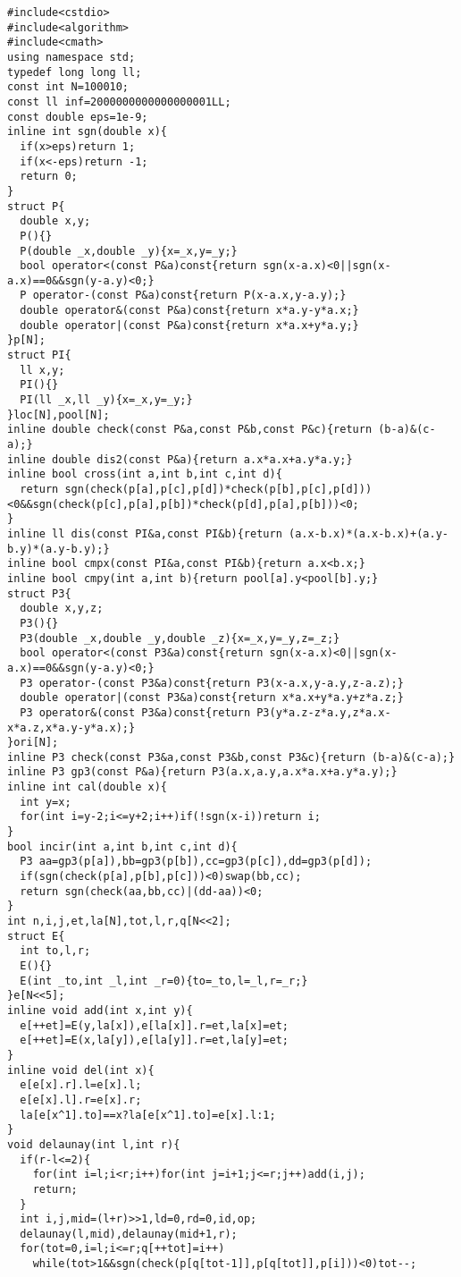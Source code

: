 \documentclass[12pt]{ctexart}
\begin{document}
\begin{lstlisting}
#include<cstdio>
#include<algorithm>
#include<cmath>
using namespace std;
typedef long long ll;
const int N=100010;
const ll inf=2000000000000000001LL;
const double eps=1e-9;
inline int sgn(double x){
  if(x>eps)return 1;
  if(x<-eps)return -1;
  return 0;
}
struct P{
  double x,y;
  P(){}
  P(double _x,double _y){x=_x,y=_y;}
  bool operator<(const P&a)const{return sgn(x-a.x)<0||sgn(x-a.x)==0&&sgn(y-a.y)<0;}
  P operator-(const P&a)const{return P(x-a.x,y-a.y);}
  double operator&(const P&a)const{return x*a.y-y*a.x;}
  double operator|(const P&a)const{return x*a.x+y*a.y;}
}p[N];
struct PI{
  ll x,y;
  PI(){}
  PI(ll _x,ll _y){x=_x,y=_y;}
}loc[N],pool[N];
inline double check(const P&a,const P&b,const P&c){return (b-a)&(c-a);}
inline double dis2(const P&a){return a.x*a.x+a.y*a.y;}
inline bool cross(int a,int b,int c,int d){
  return sgn(check(p[a],p[c],p[d])*check(p[b],p[c],p[d]))<0&&sgn(check(p[c],p[a],p[b])*check(p[d],p[a],p[b]))<0;
}
inline ll dis(const PI&a,const PI&b){return (a.x-b.x)*(a.x-b.x)+(a.y-b.y)*(a.y-b.y);}
inline bool cmpx(const PI&a,const PI&b){return a.x<b.x;}
inline bool cmpy(int a,int b){return pool[a].y<pool[b].y;}
struct P3{
  double x,y,z;
  P3(){}
  P3(double _x,double _y,double _z){x=_x,y=_y,z=_z;}
  bool operator<(const P3&a)const{return sgn(x-a.x)<0||sgn(x-a.x)==0&&sgn(y-a.y)<0;}
  P3 operator-(const P3&a)const{return P3(x-a.x,y-a.y,z-a.z);}
  double operator|(const P3&a)const{return x*a.x+y*a.y+z*a.z;}
  P3 operator&(const P3&a)const{return P3(y*a.z-z*a.y,z*a.x-x*a.z,x*a.y-y*a.x);}
}ori[N];
inline P3 check(const P3&a,const P3&b,const P3&c){return (b-a)&(c-a);}
inline P3 gp3(const P&a){return P3(a.x,a.y,a.x*a.x+a.y*a.y);}
inline int cal(double x){
  int y=x;
  for(int i=y-2;i<=y+2;i++)if(!sgn(x-i))return i;
}
bool incir(int a,int b,int c,int d){
  P3 aa=gp3(p[a]),bb=gp3(p[b]),cc=gp3(p[c]),dd=gp3(p[d]);
  if(sgn(check(p[a],p[b],p[c]))<0)swap(bb,cc);
  return sgn(check(aa,bb,cc)|(dd-aa))<0;
}
int n,i,j,et,la[N],tot,l,r,q[N<<2];
struct E{
  int to,l,r;
  E(){}
  E(int _to,int _l,int _r=0){to=_to,l=_l,r=_r;}
}e[N<<5];
inline void add(int x,int y){
  e[++et]=E(y,la[x]),e[la[x]].r=et,la[x]=et;
  e[++et]=E(x,la[y]),e[la[y]].r=et,la[y]=et;
}
inline void del(int x){
  e[e[x].r].l=e[x].l;
  e[e[x].l].r=e[x].r;
  la[e[x^1].to]==x?la[e[x^1].to]=e[x].l:1;
}
void delaunay(int l,int r){
  if(r-l<=2){
    for(int i=l;i<r;i++)for(int j=i+1;j<=r;j++)add(i,j);
    return;
  }
  int i,j,mid=(l+r)>>1,ld=0,rd=0,id,op;
  delaunay(l,mid),delaunay(mid+1,r);
  for(tot=0,i=l;i<=r;q[++tot]=i++)
    while(tot>1&&sgn(check(p[q[tot-1]],p[q[tot]],p[i]))<0)tot--;

\end{lstlisting}
\end{document}
